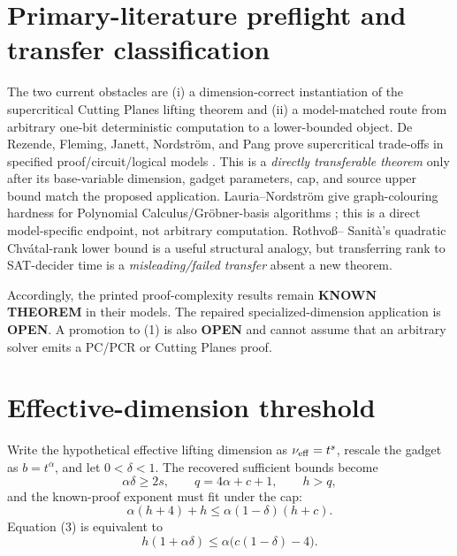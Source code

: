 \documentclass[11pt]{article}
\newcommand{\KNOWN}{\textbf{KNOWN THEOREM}}
\newcommand{\OPEN}{\textbf{OPEN}}
\begin{document}
\section{Primary-literature preflight and transfer classification}
The two current obstacles are (i) a dimension-correct instantiation of the
supercritical Cutting Planes lifting theorem and (ii) a model-matched route
from arbitrary one-bit deterministic computation to a lower-bounded object.
De Rezende, Fleming, Janett, Nordstr\"om, and Pang prove supercritical
trade-offs in specified proof/circuit/logical models \cite{derezende}.  This
is a \emph{directly transferable theorem} only after its base-variable
dimension, gadget parameters, cap, and source upper bound match the proposed
application.  Lauria--Nordstr\"om give graph-colouring hardness for
Polynomial Calculus/Gr\"obner-basis algorithms \cite{lauria}; this is a
direct model-specific endpoint, not arbitrary computation.  Rothvo\ss--
Sanit\`a's quadratic Chv\'atal-rank lower bound \cite{rothvoss} is a useful
structural analogy, but transferring rank to SAT-decider time is a
\emph{misleading/failed transfer} absent a new theorem.

Accordingly, the printed proof-complexity results remain \KNOWN{} in their
models.  The repaired specialized-dimension application is \OPEN{}.  A
promotion to (1) is also \OPEN{} and cannot assume that an arbitrary solver
emits a PC/PCR or Cutting Planes proof.

\section{Effective-dimension threshold}
Write the hypothetical effective lifting dimension as
\(\nu_{\rm eff}=t^s\), rescale the gadget as \(b=t^\alpha\), and let
\(0<\delta<1\).  The recovered sufficient bounds become
\[
 \alpha\delta\ge 2s,\qquad q=4\alpha+c+1,\qquad h>q,        \tag{2}
\]
and the known-proof exponent must fit under the cap:
\[
 \alpha(h+4)+h\le \alpha(1-\delta)(h+c).                  \tag{3}
\]
Equation (3) is equivalent to
\[
 h(1+\alpha\delta)\le \alpha\bigl(c(1-\delta)-4\bigr).   \tag{4}
\]
\end{document}
